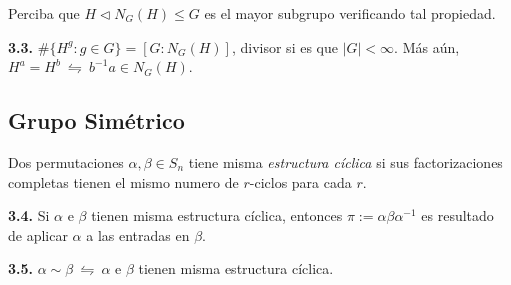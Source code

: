 \vspace{-0.2cm}
\begin{note}
    Perciba que \(H \lhd N_G(H) \leq G\) es el mayor subgrupo verificando tal propiedad. 
\end{note}

\begin{theorem}
    \textbf{3.3.} \(\#\{H^g : g \in G\} = [G : N_G(H)]\), divisor si es que \(|G| < \infty\). Más aún, \(H^a = H^b \ \leftrightharpoons \ b^{-1} a \in N_G(H)\).   
\end{theorem}


\subsection*{Grupo Simétrico}

\begin{definition}
    Dos permutaciones \(\alpha, \beta \in S_n\) tiene misma \emph{estructura cíclica} si sus factorizaciones completas tienen el mismo numero de $r$-ciclos para cada $r$. 
\end{definition}

\hypertarget{lemma34}{}
\begin{lemma}
    \textbf{3.4.} Si \(\alpha\) e \(\beta \) tienen misma estructura cíclica, entonces \(\pi := \alpha \beta \alpha^{-1}\) es resultado de aplicar \(\alpha\) a las entradas en \(\beta\).
\end{lemma}
    

\begin{theorem}
    \textbf{3.5.} \(\alpha \sim \beta \ \leftrightharpoons \ \alpha\) e \(\beta\) tienen misma estructura cíclica.
\end{theorem}


